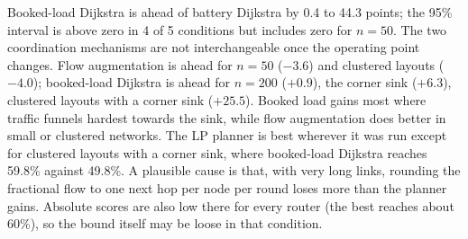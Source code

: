 Booked-load Dijkstra is ahead of battery Dijkstra by 0.4 to 44.3 points; the 95\% interval is above zero in 4 of 5 conditions but includes zero for $n=50$. The two coordination mechanisms are not interchangeable once the operating point changes. Flow augmentation is ahead for $n=50$ ($-3.6$) and clustered layouts ($-4.0$); booked-load Dijkstra is ahead for $n=200$ ($+0.9$), the corner sink ($+6.3$), clustered layouts with a corner sink ($+25.5$). Booked load gains most where traffic funnels hardest towards the sink, while flow augmentation does better in small or clustered networks. The LP planner is best wherever it was run except for clustered layouts with a corner sink, where booked-load Dijkstra reaches 59.8\% against 49.8\%. A plausible cause is that, with very long links, rounding the fractional flow to one next hop per node per round loses more than the planner gains. Absolute scores are also low there for every router (the best reaches about 60\%), so the bound itself may be loose in that condition.
